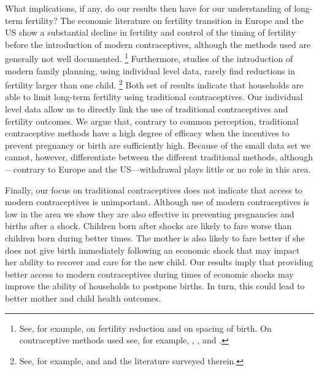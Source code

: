 \documentclass[letterpaper,12pt]{article}
\begin{document}
What implications, if any, do our results then have for our understanding 
of long-term fertility?
The economic literature on fertility transition in Europe and the US 
show a substantial decline in fertility and control of the timing of 
fertility before the introduction of modern contraceptives, although 
the methods used are generally not well documented.%
\footnote{
See, for example, \citet{Guinnane2011} on fertility reduction and 
\citet{Cinnirella2017} on spacing of birth.
On contraceptive methods used see, for example, \citet{Michael1976},
\citet{David1986}, and \citet{Santow1995}.
}
Furthermore, studies of the introduction of modern family planning, 
using individual level data, rarely find reductions in fertility larger 
than one child.%
\footnote{
See, for example, \citet{Portner2014a} 
and \citet{Portner2018} and the literature surveyed therein.
}
Both set of results indicate that households are able to 
limit long-term fertility using traditional contraceptives.
Our individual level data allow us to directly link the use of
traditional contraceptives and fertility outcomes.
We argue that, contrary to common perception, traditional
contraceptive methods have a high degree of efficacy when the
incentives to prevent pregnancy or birth are sufficiently high.
Because of the small data set we cannot, however, differentiate between
the different traditional methods, although---contrary to Europe 
and the US---withdrawal plays little or no role in this area.

Finally, our focus on traditional contraceptives does
not indicate that access to modern contraceptives is unimportant.
Although use of modern contraceptives is low in the area we show
they are also effective in preventing pregnancies and births after a shock.
Children born after shocks are likely to fare worse than children born 
during better times.
The mother is also likely to fare better if she does not give birth 
immediately following an economic shock that may impact her ability 
to recover and care for the new child.
Our results imply that providing better access to modern contraceptives 
during times of economic shocks may improve the ability of households 
to postpone births.
In turn, this could lead to better mother and child health outcomes.
\end{document}
